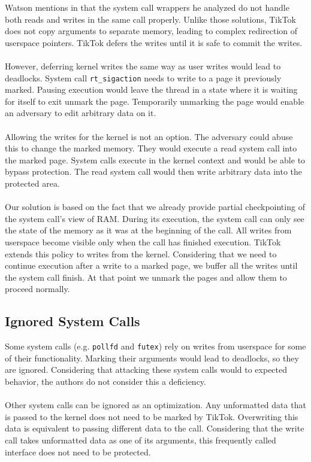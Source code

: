 Watson mentions in \cite{watson2007exploiting} that the system call wrappers he
analyzed do not handle both reads and writes in the same call properly. Unlike
those solutions, TikTok does not copy arguments to separate memory, leading to
complex redirection of userspace pointers. TikTok defers the writes until it is
safe to commit the writes.
\\
\\
However, deferring kernel writes the same way as user writes would lead to
deadlocks. System call \texttt{rt\_sigaction} needs to write to a page it
previously marked. Pausing execution would leave the thread in a state where it
is waiting for itself to exit unmark the page. Temporarily unmarking the page
would enable an adversary to edit arbitrary data on it.
\\
\\
Allowing the writes for the kernel is not an option. The adversary could abuse
this to change the marked memory. They would execute a read system call into
the marked page. System calls execute in the kernel context and would be able to
bypass protection. The read system call would then write arbitrary data into the
protected area.
\\
\\
Our solution is based on the fact that we already provide partial checkpointing 
of the system call's view of RAM. During its execution, the system call can only
see the state of the memory as it was at the beginning of the call. All writes 
from userspace become visible only when the call has finished execution. TikTok 
extends this policy to writes from the kernel. Considering that we need to 
continue execution after a write to a marked page, we buffer all the writes 
until the system call finish. At that point we unmark the pages and allow them 
to proceed normally.

\subsection{Ignored System Calls}
\label{subsec:ignoredcalls}

Some system calls (e.g. \texttt{pollfd} and \texttt{futex}) rely on writes from
userspace for some of their functionality. Marking their arguments would lead to
deadlocks, so they are ignored. Considering that attacking these system calls 
would to expected behavior, the authors do not consider this a deficiency.
\\
\\
Other system calls can be ignored as an optimization. Any unformatted data that
is passed to the kernel does not need to be marked by TikTok. Overwriting this
data is equivalent to passing different data to the call. Considering that the
write call takes unformatted data as one of its arguments, this frequently
called interface does not need to be protected.

